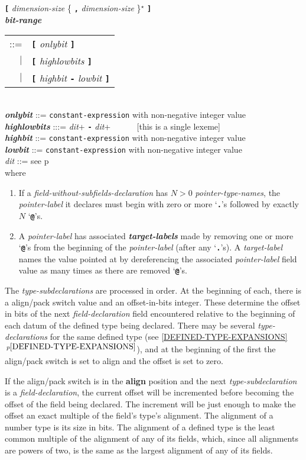 \documentclass[12pt]{article}
\newcommand{\TT}[1]{{\tt \bfseries #1}}
\newcommand{\STAR}{{\Large $^\star$}}
\newcommand{\key}[1]{{\rm \bfseries #1}}
\newcommand{\emkey}[1]{{\em \bfseries #1}}
\newcommand{\emskey}[2]{{\em \bfseries #1#2}}
\newcommand{\itemref}[1]{\ref{#1}$\,^{p\pageref{#1}}$}
\newcommand{\pagref}[1]{p\pageref{#1}}
\newenvironment{indpar}[1][0.3in]%
	{\begin{list}{}%
		     {\setlength{\itemsep}{0in}%
		      \setlength{\topsep}{0in}%
		      \setlength{\parsep}{1ex}%
		      \setlength{\labelwidth}{#1}%
		      \setlength{\leftmargin}{#1}%
		      \addtolength{\leftmargin}{\labelsep}}%
	 \item}%
	{\end{list}}
\begin{document}
\begin{indpar}
    \TT{[} {\em dimension-size} \{ \TT{,} {\em dimension-size} \}\STAR{} \TT{]}
\\[2ex]
\emkey{bit-range}
    \begin{tabular}[t]{@{}rl}
    ::= &  \TT{[} {\em onlybit} \TT{]} \\
    $|$ &  \TT{[} {\em highlowbits} \TT{]} \\
    $|$ &  \TT{[} {\em highbit} \TT{-} {\em lowbit} \TT{]}
    \end{tabular} \\
\emkey{onlybit} ::= {\tt constant-expression}
		    with non-negative integer value \\
\emkey{highlowbits} :::= {\em dit}+ \TT{-} {\em dit}+
           ~~~~~ [this is a single lexeme] \\
\emkey{highbit} ::= {\tt constant-expression}
		    with non-negative integer value \\
\emkey{lowbit} ::= {\tt constant-expression}
		   with non-negative integer value \\
{\em dit} ::= see \pagref{DIT}
\\[2ex]
where
\begin{enumerate}
\item If a {\em field-without-subfields-declaration}
has $N>0$ {\em pointer-type-names}, the {\em pointer-label}
it declares must begin with zero or more `\TT{.}'s followed by
exactly $N$ `\TT{@}'s.
\item
A {\em pointer-label} has associated \emskey{target-label}s
made by removing one or more `\TT{@}'s from the beginning of the
{\em pointer-label} (after any `\TT{.}'s).  A {\em target-label}
names the value pointed at by dereferencing the associated
{\em pointer-label} field value as many times as there are removed
`\TT{@}'s.
\end{enumerate}
\end{indpar}

The {\em type-subdeclarations} are processed in order.  At the
beginning of each, there is a align/pack switch value and an
offset-in-bits integer.  These determine the offset in bits
of the next {\em field-declaration} field encountered
relative to the beginning of each datum of the defined
type being declared.  There may be several {\em type-declarations}
for the same defined type (see \itemref{DEFINED-TYPE-EXPANSIONS}),
and at the beginning
of the first the align/pack switch is set to align and the offset
is set to zero.

If the align/pack switch is in the \key{align} position and the
next {\em type-subdeclaration} is a {\em field-declaration}, the
current offset will be incremented before becoming the offset
of the field being declared.  The increment will be just enough
to make the offset an exact multiple of the field's type's alignment.
The alignment of a number type is its size in bits.  The alignment
of a defined type is the least common multiple of the alignment of
any of its fields, which, since all alignments are powers of two,
is the same as the largest alignment of any of its fields.
\end{document}

